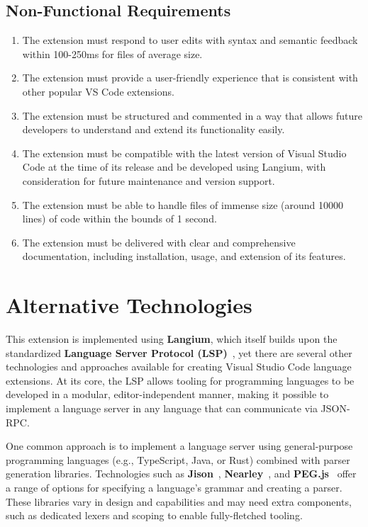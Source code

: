 \begin{multicols}{2}
  \subsection*{Non-Functional Requirements}
  \begin{enumerate}
    \item The extension must respond to user edits with syntax and semantic feedback within 100-250ms for files of average size.
    \item The extension must provide a user-friendly experience that is consistent with other popular VS Code extensions.
    \item The extension must be structured and commented in a way that allows future developers to understand and extend its functionality easily.
    \item The extension must be compatible with the latest version of Visual Studio Code at the time of its release and be developed using Langium, with consideration for future maintenance and version support.
    \item The extension must be able to handle files of immense size (around 10000 lines) of code within the bounds of 1 second.
    \item The extension must be delivered with clear and comprehensive documentation, including installation, usage, and extension of its features.
  \end{enumerate}
\end{multicols}

\section{Alternative Technologies}

This extension is implemented using \textbf{Langium}, which itself builds upon the standardized \textbf{Language Server Protocol (LSP)}~\cite{LSP}, yet
there are several other technologies and approaches available for creating Visual Studio Code language extensions. At its core, the LSP allows tooling for programming
languages to be developed in a modular, editor-independent manner, making it possible to implement a language server in any language that can communicate via JSON-RPC.

One common approach is to implement a language server using general-purpose programming languages (e.g., TypeScript, Java, or Rust) combined with parser generation libraries.
Technologies such as \textbf{Jison}~\cite{Jison}, \textbf{Nearley}~\cite{Nearley}, and \textbf{PEG.js}~\cite{PEGjs} offer a range of options for specifying a language's grammar
and creating a parser. These libraries vary in design and capabilities and may need extra components, such as dedicated lexers and scoping to enable fully-fletched tooling.

